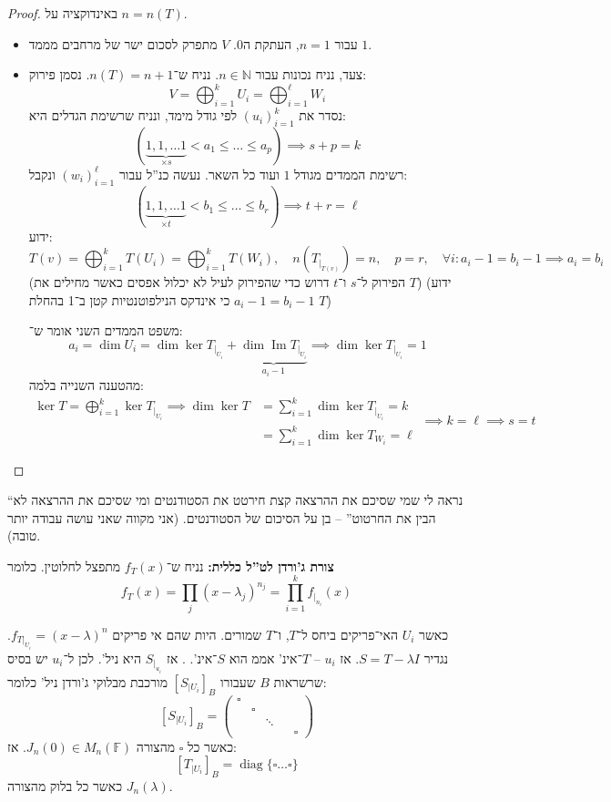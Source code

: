 \documentclass[a4paper]{article}
\newcommand\N     {\mathbb{N}}
\newcommand\ml    {\ell}
\DeclareMathOperator\Img   {Im}
\DeclareMathOperator{\diag}    {diag}
\newcommand\F         {\mathbb{F}}
\newcommand\co        {\colon}
\newcommand\pms[1]    {\begin{pmatrix}
		#1
\end{pmatrix}}
\renewcommand\lg      {\lambda}
\newcommand\cl [1]    {\left ( #1 \right )}
\newcommand\csb[1]    {\left [ #1 \right ]}
\theoremstyle{definition}
\begin{document}
	\begin{proof}
		באינדוקציה על $n  = n(T)$. 
		\begin{itemize}
			\item עבור $n = 1$, העתקת ה‏$0$. $V$ מתפרק לסכום ישר של מרחבים מממד $1$. 
			\item צעד, נניח נכונות עבור $n \in \N$. נניח ש־$n(T) = n + 1$. נסמן פירוק: 
			\[ V = \bigoplus_{i = 1}^{k} U_i = \bigoplus_{i = 1}^{\ml} W_i \]
			נסדר את $(u_i)_{i =1}^{k}$ לפי גודל מימד, ונניח שרשימת הגדלים היא: 
			\[ (\underbrace{1, 1, \dots 1 }_{\times s}< a_1 \le \dots \le a_{p}) \implies s + p = k \]
			רשימת הממדים מגודל $1$ ועוד כל השאר. נעשה כנ''ל עבור $(w_i)_{i = 1}^{\ml}$ ונקבל: 
			\[ (\underbrace{1, 1, \dots 1}_{\times t} < b_1 \le \dots \le b_r) \implies t + r = \ml \]
			ידוע:
			\[ T(v) = \bigoplus_{i = 1}^{k} T(U_i) = \bigoplus_{i = 1}^{k} T(W_i), \quad n\cl{T_{|_{T(v)}}} = n, \quad p = r, \quad \forall i \co a_i - 1 = b_i - 1 \implies a_i = b_i \]
			(הפירוק ל־$s$ ו־$t$ דרוש כדי שהפירוק לעיל לא יכלול אפסים כאשר מחילים את $T$)
			(ידוע $a_i - 1 = b_i - 1$ כי אינדקס הנילפוטנטיות קטן ב־1 בהחלת $T$)
			
			משפט הממדים השני אומר ש־: 
			\[ a_i = \dim U_i = \dim \ker T_{|_{U_i}} + \underbrace{\dim \Img T_{|_{U_i}}}_{a_i - 1} \implies \dim \ker T_{|_{U_i}} = 1 \]
			מהטענה השנייה בלמה: 
			\[ \begin{aligned}
				\ker T = \bigoplus_{i = 1}^{k} \ker T_{|_{U_i}} \implies \dim \ker T &= \sum_{i = 1}^k \dim \ker T_{|_{U_i}} = k \\
				&= \sum_{i = 1}^{k} \dim \ker T_{W_i} = \ml
			\end{aligned}\implies k = \ml \implies s = t \]
		\end{itemize}
	\end{proof}
	
	``נראה לי שמי שסיכם את ההרצאה קצת חירטט את הסטודנטים ומי שסיכם את ההרצאה לא הבין את החרטוט'' – בן על הסיכום של הסטודנטים. (אני מקווה שאני עושה עבודה יותר טובה). 
	
	\textbf{צורת ג'ורדן לט''ל כללית: }נניח ש־$f_T(x)$ מתפצל לחלוטין. כלומר
	\[ f_T(x) = \prod_{j}(x - \lg_j)^{n_j} = \prod_{i = 1}^{k}f_{|_{n_i}}(x) \]
	
	כאשר $U_i$ האי־פריקים ביחס ל־$T$, ו־$T$ שמורים. היות שהם אי פריקים $f_{T|_{U_i}} = (x - \lg)^{n}$. נגדיר $S = T - \lg I$. אז $u_i$ – $T$־אינ' אממ הוא $S$־אינ'. 
	. אז $S_{|_{u_i}}$ היא ניל'. לכן ל־$u_i$ יש בסיס שרשראות $B$ שעבורו $[S_{|{U_i}}]_B$ מורכבת מבלוקי ג'ורדן ניל' כלומר: 
	\[ \csb{S_{|{U_i}}}_B = \pms{\square \\ & \square \\ && \ddots \\ &&&& \square} \]
	כאשר כל $\square$ מהצורה $J_n(0) \in M_n(\F)$. אז: 
	\[ \csb{T_{|{U_i}}}_B = \diag\{\square \dots \square\} \]
	כאשר כל בלוק מהצורה $J_n(\lg)$. 
	
\end{document}
